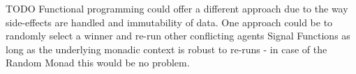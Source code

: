 TODO
Functional programming could offer a different approach due to the way side-effects are handled and immutability of data. One approach could be to randomly select a winner and re-run other conflicting agents Signal Functions as long as the underlying monadic context is robust to re-runs - in case of the Random Monad this would be no problem.